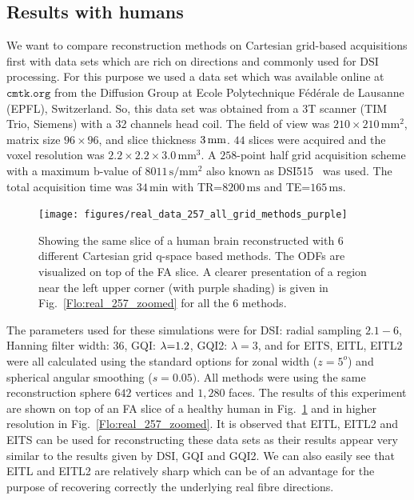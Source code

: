 \documentclass{bioinfo}
\begin{document}
\subsection{Results with humans}

We want to compare reconstruction methods on Cartesian grid-based
acquisitions first with data sets which are rich on directions and
commonly used for DSI processing. For this purpose we used a data
set which was available online at $\texttt{cmtk.org}$ from the Diffusion
Group at Ecole Polytechnique Fédérale de Lausanne (EPFL), Switzerland.
So, this data set was obtained from a 3T scanner (TIM Trio, Siemens)
with a 32 channels head coil. The field of view was $210\times210\,\textrm{mm}^{2}$,
matrix size $96\times96$, and slice thickness $3\textrm{\,\textrm{mm}}$.
$44$ slices were acquired and the voxel resolution was $2.2\times2.2\times3.0\,\textrm{mm}^{3}$.
A $258$-point half grid acquisition scheme with a maximum b-value
of $8011\,\textrm{s}/\textrm{mm}^{2}$ also known as DSI515~\citep{Wedeen}
was used. The total acquisition time was $34\,\textrm{min}$ with
TR=$8200\,\textrm{ms}$ and TE=$165\,\textrm{ms}$.

%
\begin{figure}
[th!]

\begin{centering}
\texttt{[image: figures/real\_data\_257\_all\_grid\_methods\_purple]}
\par\end{centering}

\caption{Showing the same slice of a human brain reconstructed with 6 different
Cartesian grid q-space based methods. The ODFs are visualized on top
of the FA slice. A clearer presentation of a region near the left
upper corner (with purple shading) is given in Fig.~\ref{Flo:real_257_zoomed}
for all the $6$ methods.}


\centering{}\label{Flo:real_257}
\end{figure}


The parameters used for these simulations were for DSI: radial sampling
$2.1-6$, Hanning filter width: $36$, GQI: $\text{\ensuremath{\lambda}=1.2}$,
GQI2: $\lambda=3$, and for EITS, EITL, EITL2 were all calculated
using the standard options for zonal width ($z=5^{o}$) and spherical
angular smoothing ($s=0.05)$. All methods were using the same reconstruction
sphere $642$ vertices and $1,280$ faces. The results of this experiment
are shown on top of an FA slice of a healthy human in Fig.~\ref{Flo:real_257}
and in higher resolution in Fig.~\ref{Flo:real_257_zoomed}. It is
observed that EITL, EITL2 and EITS can be used for reconstructing
these data sets as their results appear very similar to the results
given by DSI, GQI and GQI2. We can also easily see that EITL and EITL2
are relatively sharp which can be of an advantage for the purpose
of recovering correctly the underlying real fibre directions.
\end{document}
